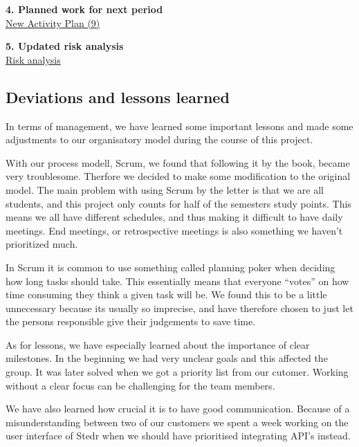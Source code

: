 \textbf{4. Planned work for next period}\\

\href{https://docs.google.com/spreadsheet/ccc?key=0AqgF_sCiXohadDQ4SlZKTTZ1ZWZ6djF2dllaZGRPSGc&usp=drive_web#gid=0}{New Activity Plan (9)}

\textbf{5. Updated risk analysis}\\

\href{https://docs.google.com/spreadsheet/ccc?key=0AlhGbQmvU9bddGs0M0tBd3ZaNUxvMnBaQnNLb0FoWnc&usp=drive_web#gid=0}{Risk analysis}

\clearpage


\subsection{Deviations and lessons learned}
In terms of management, we have learned some important lessons and made some adjustments to our organisatory model during the course of this project. 

With our process modell, Scrum, we found that following it by the book, became very troublesome. Therfore we decided to make some modification to the original model. The main problem with using Scrum by the letter is that we are all students, and this project only counts for half of the semesters study points. This means we all have different schedules, and thus making it difficult to have daily meetings. End meetings, or retrospective meetings is also something we haven’t prioritized much.

In Scrum it is common to use something called planning poker when deciding how long tasks should take. This essentially means that everyone “votes” on how time consuming they think a given task will be. We found this to be a little unnecessary because its usually so imprecise, and have therefore chosen to just let the persons responsible give their judgements to save time. 

As for lessons, we have especially learned about the importance of clear milestones. In the beginning we had very unclear goals and this affected the group. It was later solved when we got a priority list from our cutomer. Working without a clear focus can be challenging for the team members.

We have also learned how crucial it is to have good communication. Because of a misunderstanding between two of our customers we spent a week working on the user interface of Stedr when we should have prioritised integrating API’s instead.